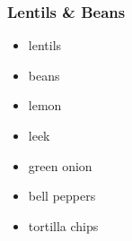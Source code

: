 \documentclass[11pt, a4paper]{article}
\begin{document}
\subsubsection{Lentils \& Beans}
\vspace{1pc}
\begin{itemize}
\item lentils
\item beans
\item lemon
\item leek
\item green onion
\item bell peppers
\item tortilla chips
\end{itemize}
\end{document}
